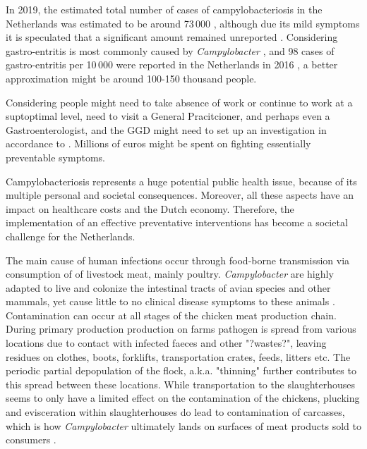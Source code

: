 In 2019, the estimated total number of cases of campylobacteriosis in the Netherlands was estimated to be around 73\,000 \parencite{lagerweij_disease_2020}, although due its mild symptoms it is speculated that a significant amount remained unreported \parencite{koutsoumanis_update_2020}. Considering gastro-entritis is most commonly caused by \textit{Campylobacter} \parencite{fouts_major_2005}, and 98 cases of gastro-entritis per 10\,000 were reported in the Netherlands in 2016 \parencite{van_pelt_jaarraport_2016}, a better approximation might be around 100-150 thousand people.

Considering people might need to take absence of work or continue to work at a suptoptimal level, need to visit a General Pracitcioner, and perhaps even a Gastroenterologist, and the GGD might need to set up an investigation in accordance to . Millions of euros might be spent on fighting essentially preventable symptoms.

Campylobacteriosis represents a huge potential public health issue, because of its multiple personal and societal consequences. Moreover, all these aspects have an impact on healthcare costs and the Dutch economy. Therefore, the implementation of an effective preventative interventions has become a societal challenge for the Netherlands.


The main cause of human infections occur through food-borne transmission via consumption of of livestock meat, mainly poultry\parencite{wilson_tracing_2008}. \textit{Campylobacter} are highly adapted to live and colonize the intestinal tracts of avian species and other mammals, yet cause little to no clinical disease symptoms to these animals \parencite{saif_diseases_2008}. Contamination can occur at all stages of the chicken meat production chain. During primary production production on farms pathogen is spread from various locations due to contact with infected faeces and other "?wastes?", leaving residues on clothes, boots, forklifts, transportation crates, feeds, litters etc. The periodic partial depopulation of the flock, a.k.a. "thinning" further contributes to this spread between these locations. While transportation to the slaughterhouses seems to only have a limited effect on the contamination of the chickens, plucking and evisceration within slaughterhouses do lead to contamination of carcasses, which is how \textit{Campylobacter} ultimately lands on surfaces of meat products sold to consumers \parencite{skarp_campylobacteriosis_2015}.

